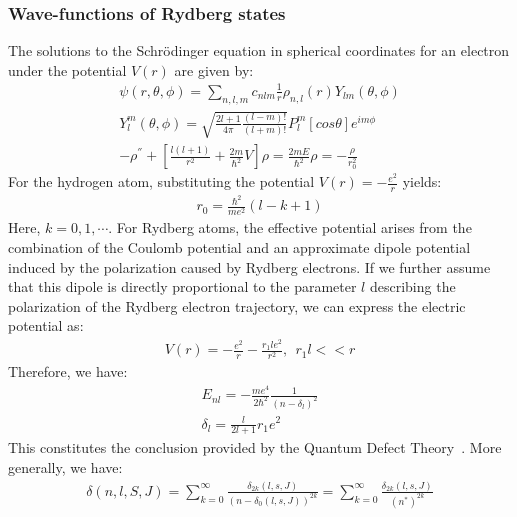 \documentclass[11pt]{article}
\begin{document}
\subsubsection{Wave-functions of Rydberg states}
The solutions to the Schrödinger equation in spherical coordinates for an electron under the potential $V(r)$ are given by:
\begin{align}
    \psi(r, \theta, \phi) = \sum_{n,l,m} c_{nlm} \frac{1}{r} \rho_{n,l}(r) Y_{lm}(\theta, \phi) \\
    Y_l^m(\theta,\phi)=\sqrt{\frac{2l+1}{4\pi}\frac{(l-m)!}{(l+m)!}}P_l^m[cos\theta]e^{im\phi} \\
    -\rho^{''} + [\frac{l(l+1)}{r^2} + \frac{2m}{\hbar^2} V] \rho = \frac{2mE}{\hbar^2} \rho =- \frac{\rho}{r_0^2}
\end{align}
For the hydrogen atom, substituting the potential $V(r) = - \frac{e^2}{r}$ yields:
\begin{align}
    r_0 = \frac{\hbar^2}{me^2}(l - k +1)
\end{align}
Here, $k = 0,1,\cdots$. For Rydberg atoms, the effective potential arises from the combination of the Coulomb potential and an approximate dipole potential induced by the polarization caused by Rydberg electrons. If we further assume that this dipole is directly proportional to the parameter $l$ describing the polarization of the Rydberg electron trajectory, we can express the electric potential as:
\begin{align}
    V(r) = - \frac{e^2}{r} - \frac{r_1 l e^2}{r^2}, \ \  r_1 l << r
\end{align}
Therefore, we have:
\begin{align}
    E_{nl} = -  \frac{m e^4}{2 \hbar^2} \frac{1}{(n - \delta_l)^2} \\
    \delta_l = \frac{l}{2l+1} r_1e^2
\end{align}
This constitutes the conclusion provided by the Quantum Defect Theory~\cite{MJSeaton_1966}. More generally, we have:
\begin{align}
    \delta(n,l,S,J) = \sum_{k = 0}^{\infty} \frac{\delta_{2k}(l,s,J)}{(n - \delta_0(l,s,J))^{2k}} = \sum_{k = 0}^{\infty} \frac{\delta_{2k}(l,s,J)}{(n^*)^{2k}}
\end{align}
\end{document}
